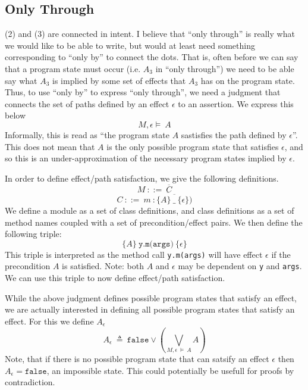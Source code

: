 \documentclass[12pt]{article}
\begin{document}
\subsection{Only Through}

(2) and (3) are connected in intent. I believe that ``only through'' is really what we would like to be able to write, 
but would at least need something corresponding to ``only by'' to connect the dots. That is, often before we can say that a program 
state must occur (i.e. $A_3$ in ``only through'') we need to be able say what $A_3$ is implied by some set of effects 
that $A_3$ has on the program state. Thus, to use ``only by'' to express ``only through'', we need a judgment 
that connects the set of paths defined by an effect $\epsilon$ to an assertion. We express this below
$$M, \epsilon \vDash\ A$$
Informally, this is read as ``the program state $A$ sastisfies the path defined by $\epsilon$''.
This does not mean that $A$ is the only possible program state that satisfies $\epsilon$, 
and so this is an under-approximation of the necessary program states implied by $\epsilon$.

In order to define effect/path satisfaction, we give the following definitions.
$$M\ ::=\ \overline{C}$$
$$C\ ::=\ \overline{m\ :\overline{\{A\}\ \_\ \{\epsilon\})}}$$
We define a module as a set of class definitions, and class definitions as a set of method names
coupled with a set of precondition/effect pairs. We then define the following triple:
$$\{A\}\ \texttt{y.m(args)}\ \{\epsilon\}$$
This triple is interpreted as the method call \texttt{y.m(args)}
will have effect $\epsilon$ if the precondition $A$ is satisfied.
Note: both $A$ and $\epsilon$ may be dependent on \texttt{y} and \texttt{args}.
We can use this triple to now define effect/path satisfaction.

While the above judgment defines possible program states
that satisfy an effect, we are actually interested in 
defining all possible program states that satisfy an 
effect. For this we define $A_\epsilon$
$$A_\epsilon\ \triangleq\ \texttt{false}\vee(\underset{M, \epsilon\ \vDash\ A}{\bigvee}A)$$
Note, that if there is no possible program state that can 
satsify an effect $\epsilon$ then $A_\epsilon = \texttt{false}$, an impossible state.
This could potentially be usefull for proofs by contradiction.
\end{document}
